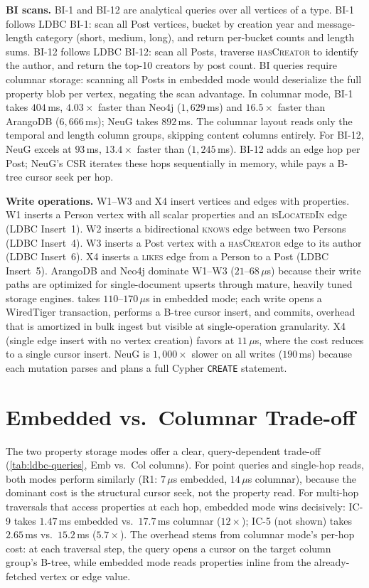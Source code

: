 \textbf{BI scans.}
BI-1 and BI-12 are analytical queries over all vertices of a
type.
BI-1 follows LDBC BI-1: scan all Post vertices, bucket by creation year and
message-length category (short, medium, long), and return per-bucket counts and
length sums.
BI-12 follows LDBC BI-12: scan all Posts, traverse \textsc{hasCreator} to
identify the author, and return the top-10 creators by post count.
%
BI queries require columnar storage: scanning all Posts in embedded mode would deserialize the full property blob per vertex, negating the scan advantage.
In columnar mode, BI-1 takes $404$\,ms, $4.03\times$ faster than Neo4j ($1{,}629$\,ms) and $16.5\times$ faster than ArangoDB ($6{,}666$\,ms); NeuG takes $892$\,ms.
The columnar layout reads only the temporal and length column groups, skipping content columns entirely.
For BI-12, NeuG excels at $93$\,ms, $13.4\times$ faster than \project{} ($1{,}245$\,ms).
BI-12 adds an edge hop per Post; NeuG's CSR iterates these hops sequentially in memory, while \project{} pays a B-tree cursor seek per hop.

\textbf{Write operations.}
W1--W3 and X4 insert vertices and edges with properties.
W1 inserts a Person vertex with all scalar properties and an
\textsc{isLocatedIn} edge (LDBC Insert~1).
W2 inserts a bidirectional \textsc{knows} edge between two Persons (LDBC
Insert~4).
W3 inserts a Post vertex with a \textsc{hasCreator} edge to its author (LDBC
Insert~6).
X4 inserts a \textsc{likes} edge from a Person to a Post (LDBC Insert~5).
%
ArangoDB and Neo4j dominate W1--W3 ($21$--$68$\,$\mu$s) because their write paths are optimized for single-document upserts through mature, heavily tuned storage engines.
\project{} takes $110$--$170$\,$\mu$s in embedded mode; each write opens a WiredTiger transaction, performs a B-tree cursor insert, and commits, overhead that is amortized in bulk ingest but visible at single-operation granularity.
X4 (single edge insert with no vertex creation) favors \project{} at $11$\,$\mu$s, where the cost reduces to a single cursor insert.
NeuG is $1{,}000\times$ slower on all writes ($190$\,ms) because each mutation parses and plans a full Cypher \texttt{CREATE} statement.

\section{Embedded vs.\ Columnar Trade-off}
\label{sec:eval:emb-vs-col}

The two property storage modes offer a clear, query-dependent trade-off (\autoref{tab:ldbc-queries}, Emb vs.\ Col columns).
For point queries and single-hop reads, both modes perform similarly (R1: $7$\,$\mu$s embedded, $14$\,$\mu$s columnar), because the dominant cost is the structural cursor seek, not the property read.
For multi-hop traversals that access properties at each hop, embedded mode wins decisively: IC-9 takes $1.47$\,ms embedded vs.\ $17.7$\,ms columnar ($12\times$); IC-5 (not shown) takes $2.65$\,ms vs.\ $15.2$\,ms ($5.7\times$).
The overhead stems from columnar mode's per-hop cost: at each traversal step, the query opens a cursor on the target column group's B-tree, while embedded mode reads properties inline from the already-fetched vertex or edge value.

